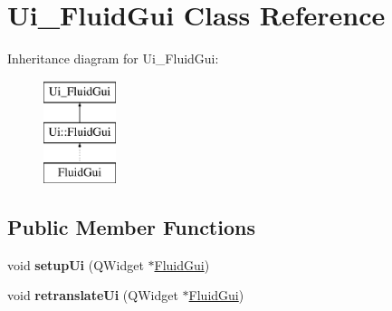 \hypertarget{class_ui___fluid_gui}{}\section{Ui\+\_\+\+Fluid\+Gui Class Reference}
\label{class_ui___fluid_gui}
Inheritance diagram for Ui\+\_\+\+Fluid\+Gui\+:\begin{figure}[H]
\begin{center}
\leavevmode
\includegraphics[height=3.000000cm]{class_ui___fluid_gui}
\end{center}
\end{figure}
\subsection*{Public Member Functions}
\begin{DoxyCompactItemize}
\item 
\mbox{\label{class_ui___fluid_gui_a962ba6b32d196dcac43e763dab0ea172}} 
void {\bfseries setup\+Ui} (Q\+Widget $\ast$\hyperlink{class_fluid_gui}{Fluid\+Gui})
\item 
\mbox{\label{class_ui___fluid_gui_ad79c276ccf99be28384d2b387e9293f3}} 
void {\bfseries retranslate\+Ui} (Q\+Widget $\ast$\hyperlink{class_fluid_gui}{Fluid\+Gui})
\end{DoxyCompactItemize}

